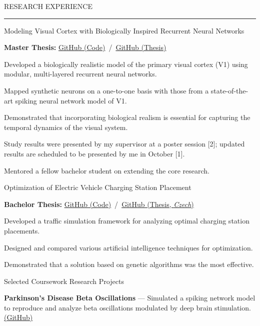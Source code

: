 \documentclass{resume} %
\renewenvironment{rSection}[1]{
\sectionskip
\textcolor{CarnegieMellonRed}{\MakeUppercase{#1}}
\sectionlineskip
\hrule
\begin{list}{}{
\setlength{\leftmargin}{1.5em}
}
\item[]
}{
\end{list}
}
\begin{document}
\begin{rSection}{Research Experience}
\begin{rProject}{\large Modeling Visual Cortex with Biologically Inspired Recurrent Neural Networks}{}{}{}
    \item {\bf Master Thesis:} \href{https://github.com/dbeinhauer/mcs-source}{GitHub (Code)} \,/\, \href{https://github.com/dbeinhauer/mcs-thesis}{GitHub (Thesis)}
    \item Developed a biologically realistic model of the primary visual cortex (V1) using modular, multi-layered recurrent neural networks.
    \item Mapped synthetic neurons on a one-to-one basis with those from a state-of-the-art spiking neural network model of V1.
    \item Demonstrated that incorporating biological realism is essential for capturing the temporal dynamics of the visual system.
    \item Study results were presented by my supervisor at a poster session [2]; updated results are scheduled to be presented by me in October [1].
    \item Mentored a fellow bachelor student on extending the core research.
\end{rProject}

\begin{rProject}{\large Optimization of Electric Vehicle Charging Station Placement}{}{}{}
    \item {\bf Bachelor Thesis:} \href{https://github.com/dbeinhauer/bcs-source}{GitHub (Code)} \,/\, \href{https://github.com/dbeinhauer/bcs-thesis}{GitHub (Thesis, \emph{Czech})}
    \item Developed a traffic simulation framework for analyzing optimal charging station placements.
    \item Designed and compared various artificial intelligence techniques for optimization.
    \item Demonstrated that a solution based on genetic algorithms was the most effective.
\end{rProject}

\begin{rProject}{\large Selected Coursework Research Projects}{}{}{}

\item \textbf{Parkinson's Disease Beta Oscillations} — Simulated a spiking network model to reproduce and analyze beta oscillations modulated by deep brain stimulation. {\href{https://github.com/dbeinhauer/parkinson_disease_project}{(GitHub)}}


\end{rProject}
\end{rSection}
\end{document}
